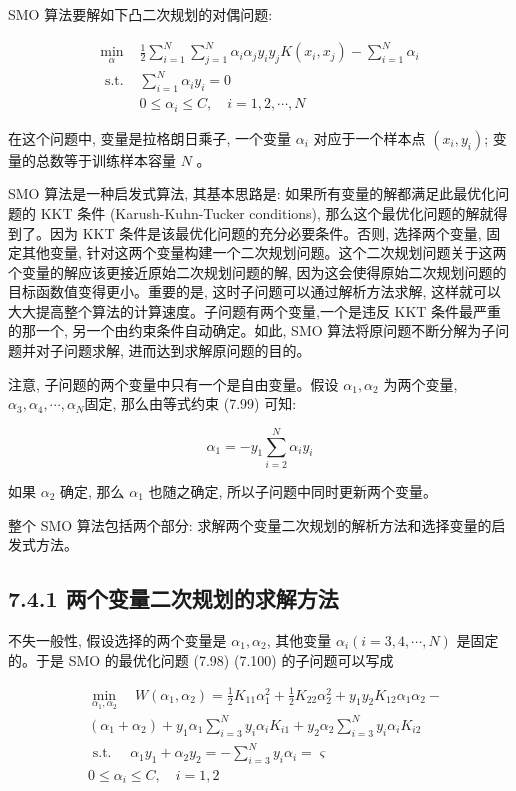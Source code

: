 \documentclass[10pt]{article}
\begin{document}
SMO 算法要解如下凸二次规划的对偶问题:

\[
\begin{array}{ll}
\min _{\alpha} & \frac{1}{2} \sum_{i=1}^{N} \sum_{j=1}^{N} \alpha_{i} \alpha_{j} y_{i} y_{j} K\left(x_{i}, x_{j}\right)-\sum_{i=1}^{N} \alpha_{i} \\
\text { s.t. } & \sum_{i=1}^{N} \alpha_{i} y_{i}=0 \\
& 0 \leqslant \alpha_{i} \leqslant C, \quad i=1,2, \cdots, N \tag{7.100}
\end{array}
\]

在这个问题中, 变量是拉格朗日乘子, 一个变量 $\alpha_{i}$ 对应于一个样本点 $\left(x_{i}, y_{i}\right)$; 变量的总数等于训练样本容量 $N$ 。

SMO 算法是一种启发式算法, 其基本思路是: 如果所有变量的解都满足此最优化问题的 KKT 条件 (Karush-Kuhn-Tucker conditions), 那么这个最优化问题的解就得到了。因为 KKT 条件是该最优化问题的充分必要条件。否则, 选择两个变量, 固定其他变量, 针对这两个变量构建一个二次规划问题。这个二次规划问题关于这两个变量的解应该更接近原始二次规划问题的解, 因为这会使得原始二次规划问题的目标函数值变得更小。重要的是, 这时子问题可以通过解析方法求解, 这样就可以大大提高整个算法的计算速度。子问题有两个变量,一个是违反 KKT 条件最严重的那一个, 另一个由约束条件自动确定。如此, SMO 算法将原问题不断分解为子问题并对子问题求解, 进而达到求解原问题的目的。

注意, 子问题的两个变量中只有一个是自由变量。假设 $\alpha_{1}, \alpha_{2}$ 为两个变量, $\alpha_{3}, \alpha_{4}, \cdots, \alpha_{N}$固定, 那么由等式约束 (7.99) 可知:

$$
\alpha_{1}=-y_{1} \sum_{i=2}^{N} \alpha_{i} y_{i}
$$

如果 $\alpha_{2}$ 确定, 那么 $\alpha_{1}$ 也随之确定, 所以子问题中同时更新两个变量。

整个 SMO 算法包括两个部分: 求解两个变量二次规划的解析方法和选择变量的启发式方法。

\subsection*{7.4.1 两个变量二次规划的求解方法}
不失一般性, 假设选择的两个变量是 $\alpha_{1}, \alpha_{2}$, 其他变量 $\alpha_{i}(i=3,4, \cdots, N)$ 是固定的。于是 SMO 的最优化问题 (7.98) (7.100) 的子问题可以写成

$$
\begin{aligned}
& \min _{\alpha_{1}, \alpha_{2}} \quad W\left(\alpha_{1}, \alpha_{2}\right)=\frac{1}{2} K_{11} \alpha_{1}^{2}+\frac{1}{2} K_{22} \alpha_{2}^{2}+y_{1} y_{2} K_{12} \alpha_{1} \alpha_{2}- \\
& \left(\alpha_{1}+\alpha_{2}\right)+y_{1} \alpha_{1} \sum_{i=3}^{N} y_{i} \alpha_{i} K_{i 1}+y_{2} \alpha_{2} \sum_{i=3}^{N} y_{i} \alpha_{i} K_{i 2} \\
& \text { s.t. } \quad \alpha_{1} y_{1}+\alpha_{2} y_{2}=-\sum_{i=3}^{N} y_{i} \alpha_{i}=\varsigma \\
& 0 \leqslant \alpha_{i} \leqslant C, \quad i=1,2
\end{aligned}
$$
\end{document}
